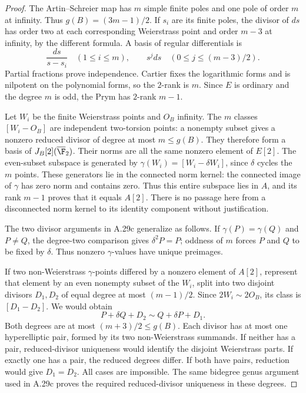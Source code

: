 \begin{proof}
The Artin--Schreier map has $m$ simple finite poles and
one pole of order $m$ at infinity. Thus
$g(B)=(3m-1)/2$. If $s_i$ are its finite poles, the
divisor of $ds$ has order two at each corresponding
Weierstrass point and order $m-3$ at infinity, by the
different formula. A basis of regular differentials is
\[
 \frac{ds}{s-s_i}\quad(1\le i\le m),
 \qquad s^jds\quad(0\le j\le(m-3)/2).
\]
Partial fractions prove independence. Cartier fixes
the logarithmic forms and is nilpotent on the polynomial
forms, so the $2$-rank is $m$. Since $E$ is ordinary
and the degree $m$ is odd, the Prym has $2$-rank $m-1$.

Let $W_i$ be the finite Weierstrass points and $O_B$
infinity. The $m$ classes $[W_i-O_B]$ are independent
two-torsion points: a nonempty subset gives a nonzero
reduced divisor of degree at most $m\le g(B)$. They
therefore form a basis of $J_B[2](\overline{\F}_2)$.
Their norms are all the same nonzero element of $E[2]$.
The even-subset subspace is generated by
$\gamma(W_i)=[W_i-\delta W_i]$, since $\delta$ cycles
the $m$ points. These generators lie in the connected
norm kernel: the connected image of $\gamma$ has zero
norm and contains zero. Thus this entire subspace lies
in $A$, and its rank $m-1$ proves that it equals $A[2]$.
There is no passage here from a disconnected norm
kernel to its identity component without justification.

The two divisor arguments in A.29c generalize as follows.
If $\gamma(P)=\gamma(Q)$ and $P\ne Q$, the degree-two
comparison gives $\delta^2P=P$; oddness of $m$ forces
$P$ and $Q$ to be fixed by $\delta$. Thus nonzero
$\gamma$-values have unique preimages.

If two non-Weierstrass $\gamma$-points differed by a
nonzero element of $A[2]$, represent that element by
an even nonempty subset of the $W_i$, split into two
disjoint divisors $D_1,D_2$ of equal degree at most
$(m-1)/2$. Since $2W_i\sim2O_B$, its class is
$[D_1-D_2]$. We would obtain
\[
 P+\delta Q+D_2\sim Q+\delta P+D_1.                    \tag{A.36}
\]
Both degrees are at most $(m+3)/2\le g(B)$. Each
divisor has at most one hyperelliptic pair, formed by
its two non-Weierstrass summands. If neither has a
pair, reduced-divisor uniqueness would identify the
disjoint Weierstrass parts. If exactly one has a pair,
the reduced degrees differ. If both have pairs,
reduction would give $D_1=D_2$. All cases are impossible.
The same bidegree genus argument used in A.29c proves
the required reduced-divisor uniqueness in these degrees.


\end{proof}
